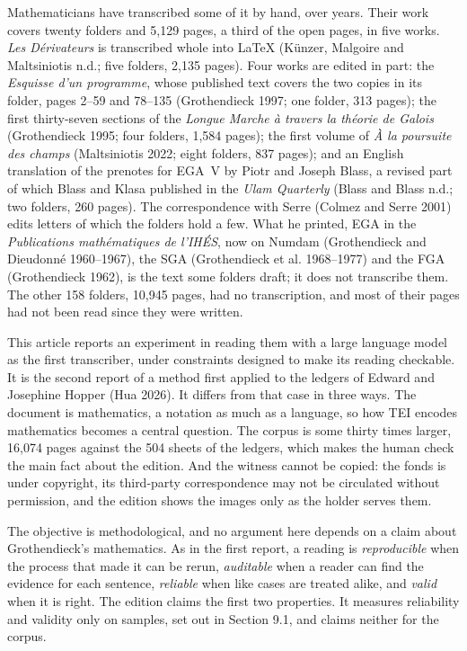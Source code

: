 \documentclass[11pt]{article}
\begin{document}
Mathematicians have transcribed some of it by hand, over years. Their work covers twenty folders and 5,129 pages, a third of the open pages, in five works. \emph{Les Dérivateurs} is transcribed whole into LaTeX (Künzer, Malgoire and Maltsiniotis n.d.; five folders, 2,135 pages). Four works are edited in part: the \emph{Esquisse d'un programme}, whose published text covers the two copies in its folder, pages 2--59 and 78--135 (Grothendieck 1997; one folder, 313 pages); the first thirty-seven sections of the \emph{Longue Marche à travers la théorie de Galois} (Grothendieck 1995; four folders, 1,584 pages); the first volume of \emph{À la poursuite des champs} (Maltsiniotis 2022; eight folders, 837 pages); and an English translation of the prenotes for EGA~V by Piotr and Joseph Blass, a revised part of which Blass and Klasa published in the \emph{Ulam Quarterly} (Blass and Blass n.d.; two folders, 260 pages). The correspondence with Serre (Colmez and Serre 2001) edits letters of which the folders hold a few. What he printed, EGA in the \emph{Publications mathématiques de l'IHÉS}, now on Numdam (Grothendieck and Dieudonné 1960--1967), the SGA (Grothendieck et al. 1968--1977) and the FGA (Grothendieck 1962), is the text some folders draft; it does not transcribe them. The other 158 folders, 10,945 pages, had no transcription, and most of their pages had not been read since they were written.

This article reports an experiment in reading them with a large language model as the first transcriber, under constraints designed to make its reading checkable. It is the second report of a method first applied to the ledgers of Edward and Josephine Hopper (Hua 2026). It differs from that case in three ways. The document is mathematics, a notation as much as a language, so how TEI encodes mathematics becomes a central question. The corpus is some thirty times larger, 16,074 pages against the 504 sheets of the ledgers, which makes the human check the main fact about the edition. And the witness cannot be copied: the fonds is under copyright, its third-party correspondence may not be circulated without permission, and the edition shows the images only as the holder serves them.

The objective is methodological, and no argument here depends on a claim about Grothendieck's mathematics. As in the first report, a reading is \emph{reproducible} when the process that made it can be rerun, \emph{auditable} when a reader can find the evidence for each sentence, \emph{reliable} when like cases are treated alike, and \emph{valid} when it is right. The edition claims the first two properties. It measures reliability and validity only on samples, set out in Section 9.1, and claims neither for the corpus.
\end{document}
